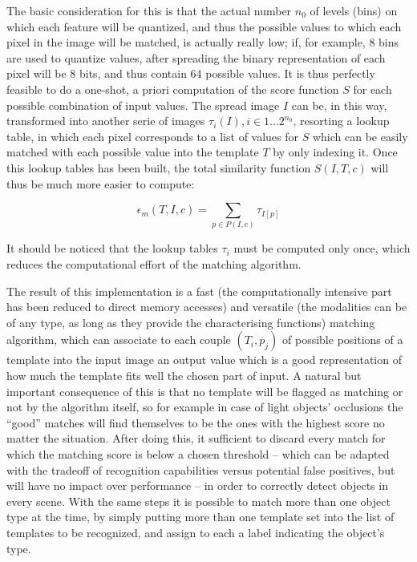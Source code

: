 The basic consideration for this is that the actual number $n_0$ of levels (bins)
on which each feature will be quantized, and thus the possible values
to which each pixel in the image will be matched, is actually really low; if,
for example, 8 bins are used to quantize values, after spreading the
binary representation of each pixel will be 8 bits, and thus contain
64 possible values. It is thus perfectly feasible to do a one-shot,
a priori computation of the score function $S$ for each possible
combination of input values. The spread image $I$ can be, in this way,
transformed into another serie of images $\tau_i(I), i \in 1 \dots 2^{n_0}$, resorting a lookup table, in
which each pixel corresponds to a list of values for $S$ which can be
easily matched with each possible value into the template $T$ by only
indexing it. Once this lookup tables has been built, the total
similarity function $S(I,T,c)$ will thus be much more easier to compute:

\begin{equation}
  \epsilon_m (T,I,c)=\sum_{p\in P(I,c)} { \tau_{I[p]} }
\end{equation}

It should be noticed that the lookup tables $\tau_i$ must be computed
only once, which reduces the computational effort of the matching
algorithm.

The result of this implementation is a fast (the computationally
intensive part has been reduced to direct memory accesses) and
versatile (the modalities can be of any type, as long as they provide
the characterising functions) matching algorithm, which can associate
to each couple $(T_i,p_j)$ of possible positions of a template into
the input image an output value which is a good representation of how
much the template fits well the chosen part of input. A natural but
important consequence of this is that no template will be flagged as
matching or not by the algorithm itself, so for example in case of light objects'
occlusions the ``good'' matches will find themselves to be the
ones with the highest score no matter the situation. After doing
this, it sufficient to discard every match for which the matching
score is below a chosen threshold -- which can be adapted with the
tradeoff of recognition capabilities versus potential false positives,
but will have no impact over performance -- in order to correctly
detect objects in every scene. With the same steps it is possible to
match more than one object type at the time, by simply putting more
than one template set into the list of templates to be recognized, and
assign to each a label indicating the object's type.

